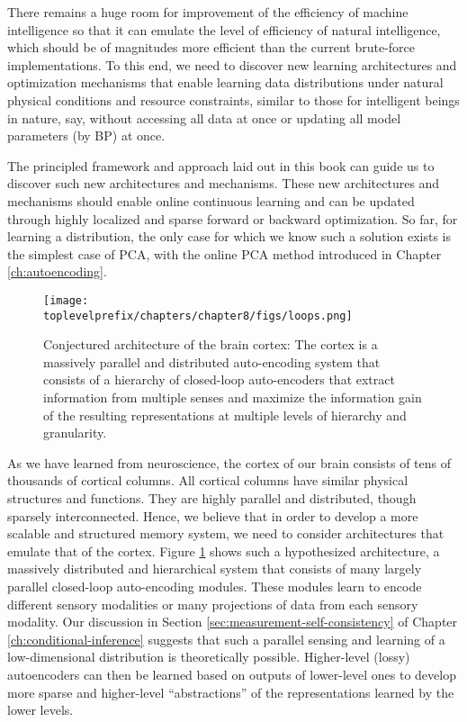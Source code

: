 \documentclass[\toplevelprefix/book-main.tex]{subfiles}
\begin{document}
There remains a huge room for  improvement of the efficiency of   machine intelligence so that it can emulate the level of efficiency of natural intelligence, which should be of magnitudes more efficient than the current brute-force implementations. To this end, we need to discover new learning architectures and optimization mechanisms that enable learning data distributions under natural physical conditions and resource constraints, similar to those for intelligent beings in nature, say, without accessing all data at once or updating all model parameters (by BP) at once. 

The principled framework and approach laid out in this book can guide us to discover such new architectures and mechanisms.  These new architectures and mechanisms should enable online continuous learning and can be updated through highly localized and sparse forward or backward optimization. So far, for learning a distribution, the only case for which we know such a solution exists is the simplest case of PCA, with the online PCA method introduced in Chapter \ref{ch:autoencoding}.  

\begin{figure}[t]
\centering
\texttt{[image: \\toplevelprefix/chapters/chapter8/figs/loops.png]}
    \caption{Conjectured architecture of the brain cortex: The cortex is a massively parallel and distributed auto-encoding system that consists of a hierarchy of closed-loop auto-encoders that extract information from multiple senses and maximize the information  gain of the resulting representations at multiple levels of hierarchy and granularity.}
    \label{fig:loops}
\end{figure}
As we have learned from neuroscience, the cortex of our brain consists of tens of thousands of cortical columns. All cortical columns have similar physical structures and functions. They are highly parallel and distributed, though sparsely interconnected. Hence, we believe that in order to develop a more scalable and structured memory system, we need to consider architectures that emulate that of the cortex. Figure \ref{fig:loops} shows such a hypothesized architecture, a massively distributed and hierarchical system that consists of many largely parallel closed-loop auto-encoding modules. These modules learn to encode different sensory modalities or many projections of data from each sensory modality. Our discussion in Section \ref{sec:measurement-self-consistency} of Chapter \ref{ch:conditional-inference} suggests that such a parallel sensing and learning of a low-dimensional distribution is theoretically possible. Higher-level (lossy) autoencoders can then be learned based on outputs of lower-level ones to develop more sparse and higher-level  ``abstractions'' of the representations learned by the lower levels. 
\end{document}

